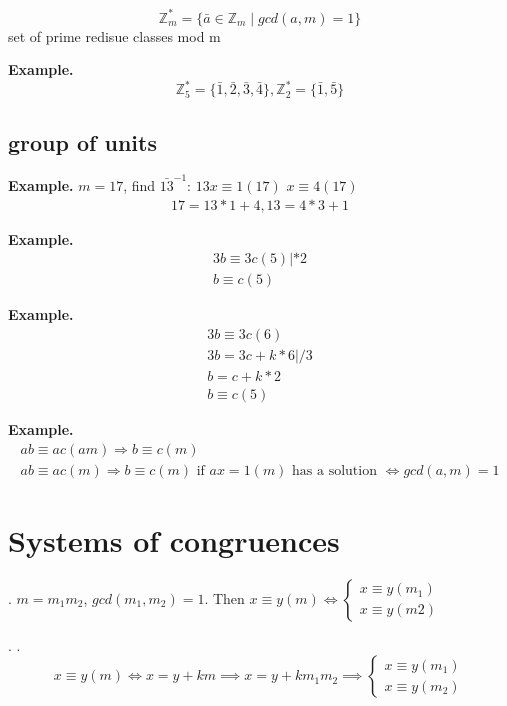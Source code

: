 \begin{definition}
\[
  \mathbb{Z}_m^{*} = \{ \bar{a} \in \mathbb{Z}_m \mid gcd(a,m) = 1 \}
\]
set of prime redisue classes mod m
\end{definition}

\textbf{Example.}
\[
  \mathbb{Z}_5^{*} = \{ \bar{1}, \bar{2}, \bar{3}, \bar{4} \}, \mathbb{Z}_2^{*} = \{ \bar{1}, \bar{5} \}
\]

\subsection{group of units}

\textbf{Example.}
$ m = 17$, find $\bar{13}^{-1}$: $ 13 x \equiv 1 (17)$ $x \equiv 4 (17)$
\begin{align*}
  17 = 13 * 1 +4, 13 = 4*3 +1 
\end{align*}

\textbf{Example.}
\begin{align*}
  3b \equiv 3c (5) | *2 \\
  b \equiv c(5)
\end{align*}

\textbf{Example.}
\begin{align*}
  3b \equiv 3c (6) \\
  3b = 3c + k*6 | /3 \\
  b = c + k*2 \\
  b \equiv c(5)
\end{align*}

\textbf{Example.}
\begin{align*}
  ab \equiv ac (am) \Rightarrow b \equiv  c (m) \\
  ab \equiv ac (m) \Rightarrow b \equiv c (m)
    \text{ if } ax = 1 (m) \text{ has a solution } \iff gcd(a,m) = 1
\end{align*}

\section{Systems of congruences}

\Theorem.
$m = m_1 m_2$, $gcd(m_1, m_2) = 1$. Then $x \equiv y (m) \iff \begin{cases} x \equiv y (m_1) \\ x \equiv y (m2) \end{cases}$

\Proof.
\ProofForward.
\[
  x \equiv y (m) \iff x = y + km \implies x = y + k m_1 m_2 \implies
  \begin{cases}
    x \equiv y (m_1) \\
    x \equiv y (m_2) 
  \end{cases}
\]

